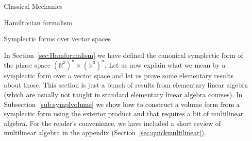 \documentclass[oneside,a4paper,11pt]{amsbook}
\newcommand{\R}{\mathds R}
\theoremstyle{remark}\newtheorem{exercise}{Exercise}[chapter]
\theoremstyle{plain}\newtheorem{teo}{Theorem}[section]
\theoremstyle{plain}\newtheorem{lem}[teo]{Lemma}
\theoremstyle{plain}\newtheorem{prop}[teo]{Proposition}
\theoremstyle{plain}\newtheorem{cor}[teo]{Corollary}
\theoremstyle{definition}\newtheorem{defin}[teo]{Definition}
\theoremstyle{remark}\newtheorem{rem}[teo]{Remark}
\theoremstyle{definition}\newtheorem{notation}[teo]{Notation}
\theoremstyle{definition}\newtheorem{convention}[teo]{Convention}
\theoremstyle{definition}\newtheorem{example}[teo]{Example}
\numberwithin{section}{chapter}
\numberwithin{equation}{section}
\begin{document}
\begin{chapter}{Classical Mechanics}
\begin{section}{Hamiltonian formalism}
\end{section}

\begin{section}{Symplectic forms over vector spaces}
\label{sec:symplvecspace}

In Section~\ref{sec:Hamformalism} we have defined the canonical symplectic form of the phase space
$(\R^3)^n\times(\R^3)^n$. Let us now explain what we mean by a symplectic form over a vector space and let us
prove some elementary results about those. This section is just a bunch of results from
elementary linear algebra (which are usually not taught in standard elementary linear algebra courses).
In Subsection~\ref{sub:symplvolume} we show how to construct a volume form from a symplectic form using the exterior product and that requires
a bit of multilinear algebra. For the reader's convenience, we have included a short review of multilinear algebra in the appendix
(Section~\ref{sec:quickmultilinear}).


\end{section}
\end{chapter}
\end{document}
